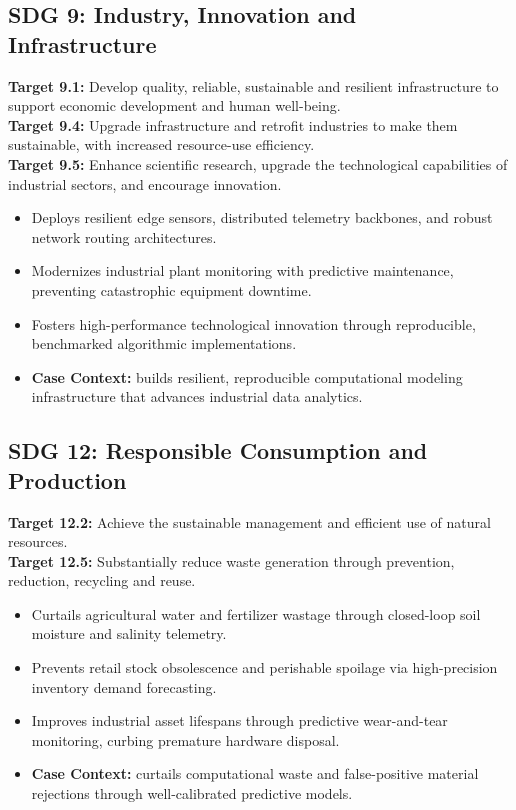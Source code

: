 \subsection{SDG 9: Industry, Innovation and Infrastructure}
\noindent\textbf{Target 9.1:} Develop quality, reliable, sustainable and resilient infrastructure to support economic development and human well-being. \\
\noindent\textbf{Target 9.4:} Upgrade infrastructure and retrofit industries to make them sustainable, with increased resource-use efficiency. \\
\noindent\textbf{Target 9.5:} Enhance scientific research, upgrade the technological capabilities of industrial sectors, and encourage innovation.
\begin{itemize}
  \item Deploys resilient edge sensors, distributed telemetry backbones, and robust network routing architectures.
  \item Modernizes industrial plant monitoring with predictive maintenance, preventing catastrophic equipment downtime.
  \item Fosters high-performance technological innovation through reproducible, benchmarked algorithmic implementations.
  \item \textbf{Case Context:} builds resilient, reproducible computational modeling infrastructure that advances industrial data analytics.
\end{itemize}

\subsection{SDG 12: Responsible Consumption and Production}
\noindent\textbf{Target 12.2:} Achieve the sustainable management and efficient use of natural resources. \\
\noindent\textbf{Target 12.5:} Substantially reduce waste generation through prevention, reduction, recycling and reuse.
\begin{itemize}
  \item Curtails agricultural water and fertilizer wastage through closed-loop soil moisture and salinity telemetry.
  \item Prevents retail stock obsolescence and perishable spoilage via high-precision inventory demand forecasting.
  \item Improves industrial asset lifespans through predictive wear-and-tear monitoring, curbing premature hardware disposal.
  \item \textbf{Case Context:} curtails computational waste and false-positive material rejections through well-calibrated predictive models.
\end{itemize}
